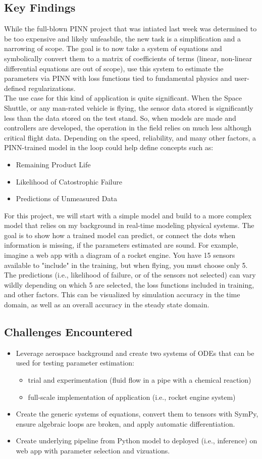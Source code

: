\documentclass[11pt,letterpaper]{article}
\newcommand{\findings}[1]{
    \subsection*{Key Findings}
    #1
}
\newcommand{\challenges}[1]{
    \subsection*{Challenges Encountered}
    #1
}
\begin{document}
\findings{
While the full-blown PINN project that was intiated last week was determined to be too expensive and likely unfeasbile, the new task is a simplification and a narrowing of scope. The goal is to now take a system of equations and symbolically convert them to a matrix of coefficients of terms (linear, non-linear differential equations are out of scope), use this system to estimate the parameters via PINN with loss functions tied to fundamental physics and user-defined regularizations. \\

The use case for this kind of application is quite significant. When the Space Shuttle, or any man-rated vehicle is flying, the sensor data stored is significantly less than the data stored on the test stand. So, when  models are made and controllers are developed, the operation in the field relies on much less although critical flight data. Depending on the speed, reliability, and many other factors, a PINN-trained model in the loop could help define concepts such as:
\begin{itemize}
    \item Remaining Product Life
    \item Likelihood of Catostrophic Failure 
    \item Predictions of Unmeasured Data
\end{itemize}

For this project, we will start with a simple model and build to a more complex model that relies on my background in real-time modeling physical systems. The goal is to show how a trained model can predict, or connect the dots when information is missing, if the parameters estimated are sound. For example, imagine a web app with a diagram of a rocket engine. You have 15 sensors available to "include" in the training, but when flying, you must choose only 5. The predictions (i.e., likelihood of failure, or of the sensors not selected) can vary wildly depending on which 5 are selected, the loss functions included in training, and other factors. This can be visualized by simulation accuracy in the time domain, as well as an overall accuracy in the steady state domain.

}

\challenges{
\begin{itemize}
    \item Leverage aerospace background and create two systems of ODEs that can be used for testing parameter estimation: 
    \begin{itemize}
        \item trial and experimentation (fluid flow in a pipe with a chemical reaction)
        \item full-scale implementation of application (i.e., rocket engine system)
    \end{itemize}
    \item Create the generic systems of equations, convert them to tensors with SymPy, ensure algebraic loops are broken, and apply automatic differentiation.
    \item Create underlying pipeline from Python model to deployed (i.e., inference) on web app with parameter selection and vizuations.
\end{itemize}
}
\end{document}

